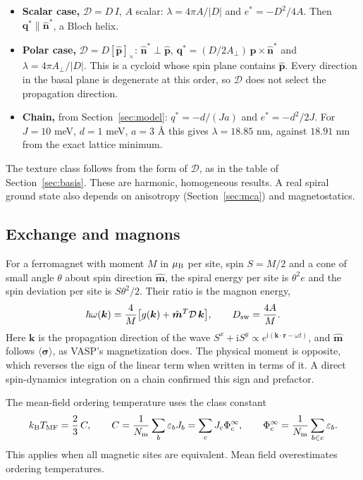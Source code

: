 \documentclass[11pt,a4paper]{article}
\numberwithin{equation}{section}
\newcommand{\vct}[1]{\bm{#1}}
\newcommand{\nh}{\hat{\vct n}}
\newcommand{\qh}{\vct q}
\newcommand{\kh}{\vct k}
\newcommand{\Nm}{N_{\mathrm m}}
\newcommand{\ii}{\mathrm i}
\newcommand{\Dt}{\mathcal D}
\begin{document}
\begin{itemize}
\item \textbf{Scalar case,} $\Dt=D\,I$, $A$ scalar: $\lambda=4\pi A/|D|$ and
$e^*=-D^2/4A$. Then $\qh^*\parallel\nh^*$, a Bloch helix.
\item \textbf{Polar case,} $\Dt=D[\hat{\vct p}]_\times$:
$\nh^*\perp\hat{\vct p}$, $\qh^*=(D/2A_\perp)\,\hat{\vct p}\times\nh^*$ and
$\lambda=4\pi A_\perp/|D|$. This is a cycloid whose spin plane contains
$\hat{\vct p}$. Every direction in the basal plane is degenerate at this order,
so $\Dt$ does not select the propagation direction.
\item \textbf{Chain,} from Section~\ref{sec:model}: $q^*=-d/(Ja)$ and
$e^*=-d^2/2J$. For $J=10$ meV, $d=1$ meV, $a=3$ \AA{} this gives
$\lambda=18.85$ nm, against $18.91$ nm from the exact lattice minimum.
\end{itemize}

The texture class follows from the form of $\Dt$, as in the table of
Section~\ref{sec:basis}. These are harmonic, homogeneous results. A real spiral
ground state also depends on anisotropy (Section~\ref{sec:mca}) and
magnetostatics.

\subsection{Exchange and magnons}

For a ferromagnet with moment $M$ in $\mu_{\rm B}$ per site, spin $S=M/2$
and a cone of small angle $\theta$ about spin direction $\hat{\vct m}$, the
spiral energy per site is $\theta^2e$ and the spin deviation per site
is $S\theta^2/2$. Their ratio is the magnon energy,
\begin{equation}\label{eq:magnon}
 \hbar\omega(\kh)=\frac{4}{M}\bigl[g(\kh)+\hat{\vct m}^{T}\Dt\,\kh\bigr],
 \qquad D_{\rm sw}=\frac{4A}{M}.
\end{equation}
Here $\kh$ is the propagation direction of the wave
$S^x+\ii S^y\propto e^{\ii(\kh\cdot\vct r-\omega t)}$, and $\hat{\vct m}$ follows
$\langle\vct\sigma\rangle$, as VASP's magnetization does. The physical moment is
opposite, which reverses the sign of the linear term when written in terms of it.
A direct spin-dynamics integration on a chain confirmed this sign and prefactor.

The mean-field ordering temperature uses the class constant
\begin{equation}\label{eq:tmf}
 k_{\rm B}T_{\rm MF}=\frac23\,C,\qquad
 C=\frac{1}{\Nm}\sum_b\varepsilon_bJ_b=\sum_cJ_c\Phi_c^{\infty},\qquad
 \Phi_c^{\infty}=\frac{1}{\Nm}\sum_{b\in c}\varepsilon_b.
\end{equation}
This applies when all magnetic sites are equivalent. Mean field overestimates
ordering temperatures.
\end{document}
